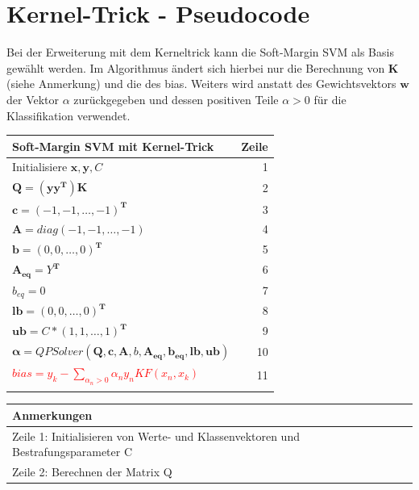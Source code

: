 \documentclass[a4paper,11pt,twoside]{scrreprt}
\begin{document}
\section{Kernel-Trick - Pseudocode}\label{sec:kernpseudo}
Bei der Erweiterung mit dem Kerneltrick kann die Soft-Margin SVM als Basis gewählt werden.
Im Algorithmus ändert sich hierbei nur die Berechnung von $\mathbf{K}$ (siehe Anmerkung) und die des bias. %
Weiters wird anstatt des Gewichtsvektors $\mathbf{w}$ der Vektor $\alpha$ zurückgegeben und dessen positiven Teile $\alpha > 0$ für die Klassifikation verwendet.
\begin{table}[H]\label{tab:kernelpc}
\begin{tabular}{|l r|}
    \hline
    \textbf{Soft-Margin SVM mit Kernel-Trick} & \textbf{Zeile} \\
    \hline
    Initialisiere $\mathbf{x}, \mathbf{y}, C$ & 1\\
    $\mathbf{Q} = (\mathbf{y}\mathbf{y}^{\mathbf{T}})\mathbf{K}$ & 2\\
    $\mathbf{c} = \left( -1, -1, \ldots, -1 \right)^{\mathbf{T}}$ & 3 \\
    $\mathbf{A} = diag\left( -1, -1, \ldots, -1 \right)$ & 4 \\
    $\mathbf{b} = \left( 0, 0, \ldots, 0 \right)^{\mathbf{T}}$ & 5\\
    $\mathbf{A_{eq}} = Y^{\mathbf{T}}$ & 6\\
    $b_{eq} = 0$ & 7\\
    $\mathbf{lb} = \left( 0, 0, \ldots, 0 \right)^{\mathbf{T}}$ & 8 \\
    $\mathbf{ub} = C * \left( 1, 1, \ldots, 1 \right)^{\mathbf{T}}$ & 9 \\
    $\mathbf{\alpha} = QPSolver\left( \mathbf{Q}, \mathbf{c}, \mathbf{A}, b, \mathbf{A_{eq}}, \mathbf{b_{eq}}, \mathbf{lb}, \mathbf{ub} \right)$ & 10\\
    \textcolor{red}{$bias = y_{k} - \sum\limits_{\alpha_{n} > 0} \alpha_{n} y_{n} KF\left( x_{n}, x_{k} \right) $} & 11 \\
    & \\
    \hline
\end{tabular}
\begin{tabular}{|l|}
    \hline
    \textbf{Anmerkungen} \\
    \hline
    Zeile 1: Initialisieren von Werte- und Klassenvektoren und Bestrafungsparameter C\\
    Zeile 2: Berechnen der Matrix Q \\

\end{tabular}
\end{table}
\end{document}
